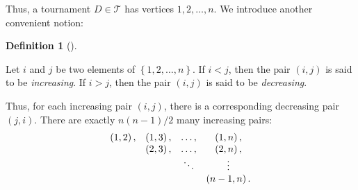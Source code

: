 \documentclass[numbers=enddot,12pt,final,onecolumn,notitlepage]{scrartcl}%
\numberwithin{exer}{subsection}
\theoremstyle{definition}
\newtheorem{defi}[theo]{Definition}
\newenvironment{definition}[1][]
{\begin{defi}[#1]\begin{leftbar}}
{\end{leftbar}\end{defi}}
\begin{document}
Thus, a tournament $D\in\mathcal{T}$ has vertices $1,2,\ldots,n$. We introduce
another convenient notion:

\begin{definition}
Let $i$ and $j$ be two elements of $\left\{  1,2,\ldots,n\right\}  $. If
$i<j$, then the pair $\left(  i,j\right)  $ is said to be \emph{increasing}.
If $i>j$, then the pair $\left(  i,j\right)  $ is said to be \emph{decreasing}.
\end{definition}

Thus, for each increasing pair $\left(  i,j\right)  $, there is a
corresponding decreasing pair $\left(  j,i\right)  $. There are exactly
$n\left(  n-1\right)  /2$ many increasing pairs:%
\[%
\begin{array}
[c]{cccc}%
\left(  1,2\right)  , & \left(  1,3\right)  , & \ldots, & \left(  1,n\right)
,\\
& \left(  2,3\right)  , & \ldots, & \left(  2,n\right)  ,\\
&  & \ddots & \vdots\\
&  &  & \left(  n-1,n\right)  .
\end{array}
\]


\Needspace{35pc}
\end{document}
